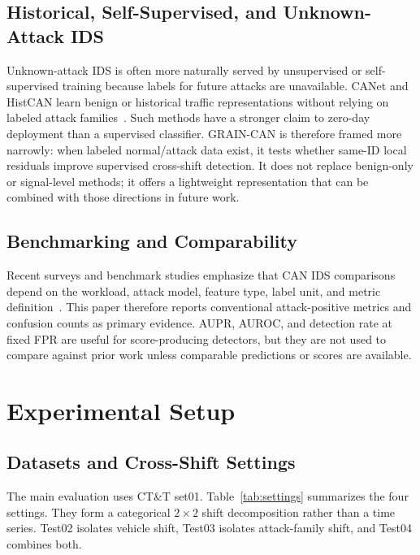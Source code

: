 \documentclass[runningheads]{llncs}
\newcommand{\method}{GRAIN-CAN}
\begin{document}
\subsection{Historical, Self-Supervised, and Unknown-Attack IDS}
Unknown-attack IDS is often more naturally served by unsupervised or self-supervised training because labels for future attacks are unavailable. CANet and HistCAN learn benign or historical traffic representations without relying on labeled attack families~\cite{canet2019,zhuo2024histcan}. Such methods have a stronger claim to zero-day deployment than a supervised classifier. \method{} is therefore framed more narrowly: when labeled normal/attack data exist, it tests whether same-ID local residuals improve supervised cross-shift detection. It does not replace benign-only or signal-level methods; it offers a lightweight representation that can be combined with those directions in future work.

\subsection{Benchmarking and Comparability}
Recent surveys and benchmark studies emphasize that CAN IDS comparisons depend on the workload, attack model, feature type, label unit, and metric definition~\cite{sharmin2024survey,kidmose2024cansleuth,guerra2024road}. This paper therefore reports conventional attack-positive metrics and confusion counts as primary evidence. AUPR, AUROC, and detection rate at fixed FPR are useful for score-producing detectors, but they are not used to compare against prior work unless comparable predictions or scores are available.

\section{Experimental Setup}
\subsection{Datasets and Cross-Shift Settings}
The main evaluation uses CT\&T set01. Table~\ref{tab:settings} summarizes the four settings. They form a categorical \(2 \times 2\) shift decomposition rather than a time series. Test02 isolates vehicle shift, Test03 isolates attack-family shift, and Test04 combines both.
\end{document}
